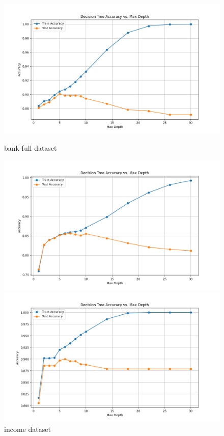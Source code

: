 \documentclass[8pt]{article}
\begin{document}
\begin{figure}[H]
    \centering
    \begin{minipage}{0.32\textwidth}
        \centering
        \includegraphics[width=\textwidth]{../Prob2/out/task2/full_bank/AccuracyVsMaxDepth_30.png}
        \caption{bank-full dataset}
        \label{fig:AccuracyVsMaxDepth_30 on bank_full dataset}
    \end{minipage}
    \begin{minipage}{0.32\textwidth}
        \centering
        \includegraphics[width=\textwidth]{../Prob2/out/task2/income/AccuracyVsMaxDepth_30.png}
        \caption{income dataset}
        \label{fig:AccuracyVsMaxDepth_30 on income dataset}
    \end{minipage}
    \begin{minipage}{0.32\textwidth}
        \centering
        \includegraphics[width=\textwidth]{../Prob2/out/task2/moon/AccuracyVsMaxDepth_30.png}

\end{minipage}
\end{figure}
\end{document}
